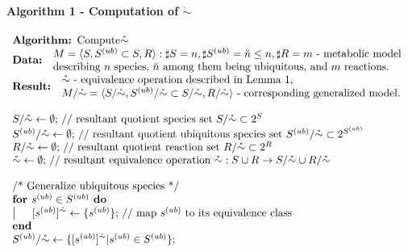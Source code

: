 \documentclass[9pt]{article}
\begin{document}
\paragraph*{Algorithm 1 - Computation of $\mathring{\sim}$}
\[ \begin{array}{l}
\mbox{\textbf{Algorithm: }Compute$\mathring{\sim}$}\\
\mbox{\textbf{Data: }} \begin{array}{l} \mbox{$M=\langle{S, S^{(ub)}\subset{S}, R}\rangle: \sharp S = n, \sharp S^{(ub)}=\breve{n} \leq n, \sharp R = m$ - metabolic model}\\ \mbox{describing $n$ species,  $\breve{n}$ among them being ubiquitous,  and $m$ reactions.} 
\end{array}\\
\mbox{\textbf{Result: }} \begin{array}{l} \mbox{$\mathring{\sim}$ - equivalence operation described in Lemma~1,}\\  \mbox{$M/{\mathring{\sim}} = \langle S/{\mathring{\sim}}, S^{(ub)}/{\mathring{\sim}} \subset S/{\mathring{\sim}}, R/{\mathring{\sim}} \rangle$ - corresponding generalized model.} \end{array}\\
\mbox{~}\\
\mbox{$S/{\mathring{\sim}} \leftarrow \emptyset;$ // resultant quotient species set $ S/{\mathring{\sim}}\subset 2^S$}\\
\mbox{$S^{(ub)}/{\mathring{\sim}} \leftarrow \emptyset;$ // resultant quotient ubiquitous species set $ S^{(ub)}/{\mathring{\sim}}\subset 2^{S^{(ub)}}$}\\
\mbox{$R/{\mathring{\sim}} \leftarrow \emptyset;$ // resultant quotient reaction set $ R/{\mathring{\sim}}\subset 2^R$}\\
\mbox{$\mathring{\sim} \leftarrow \emptyset;$ // resultant equivalence operation $ {\mathring{\sim}}: S\cup{R} \rightarrow S/{\mathring{\sim}}\cup{R/{\mathring{\sim}}}$}\\
\mbox{~}\\
\mbox{/* Generalize ubiquitous species */}\\
\mbox{\textbf{for }$s^{(ub)} \in S^{(ub)}$\textbf{ do}}\\
\left| \indent\mbox{$[s^{(ub)}]^{\mathring{\sim}} \leftarrow \{s^{(ub)}\};$ // map $s^{(ub)}$ to its equivalence class}\right. \\
\mbox{\textbf{end}}\\
\mbox{$S^{(ub)}/{\mathring{\sim}} \leftarrow \{[s^{(ub)}]^{\mathring{\sim}}|s^{(ub)} \in S^{(ub)}\};$}\\

\end{array}\]
\end{document}
